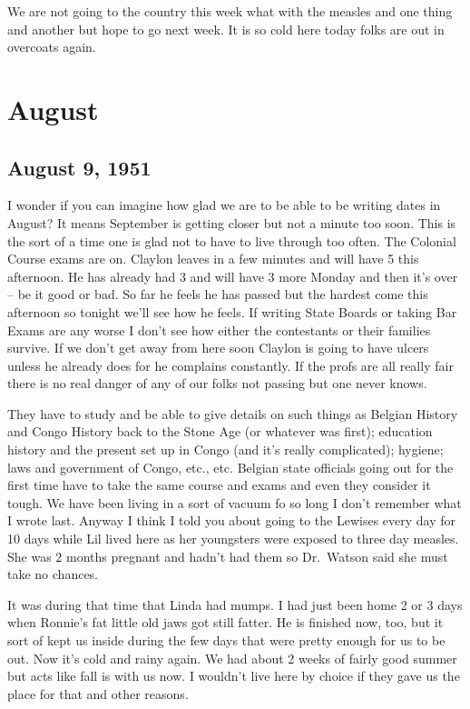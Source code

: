 \documentclass[
]{book}
\begin{document}
We are not going to the country this week what with the measles and one thing and another but hope to go next week. It is so cold here today folks are out in overcoats again.

\hypertarget{august-1}{%
\section{August}\label{august-1}}

\hypertarget{august-9-1951}{%
\subsection{August 9, 1951}\label{august-9-1951}}

I wonder if you can imagine how glad we are to be able to be writing dates in August? It means September is getting closer but not a minute too soon. This is the sort of a time one is glad not to have to live through too often. The Colonial Course exams are on. Claylon leaves in a few minutes and will have 5 this afternoon. He has already had 3 and will have 3 more Monday and then it's over -- be it good or bad. So far he feels he has passed but the hardest come this afternoon so tonight we'll see how he feels. If writing State Boards or taking Bar Exams are any worse I don't see how either the contestants or their families survive. If we don't get away from here soon Claylon is going to have ulcers unless he already does for he complains constantly. If the profs are all really fair there is no real danger of any of our folks not passing but one never knows.

They have to study and be able to give details on such things as Belgian History and Congo History back to the Stone Age (or whatever was first); education history and the present set up in Congo (and it's really complicated); hygiene; laws and government of Congo, etc., etc. Belgian state officials going out for the first time have to take the same course and exams and even they consider it tough. We have been living in a sort of vacuum fo so long I don't remember what I wrote last. Anyway I think I told you about going to the Lewises every day for 10 days while Lil lived here as her youngsters were exposed to three day measles. She was 2 months pregnant and hadn't had them so Dr.~Watson said she must take no chances.

It was during that time that Linda had mumps. I had just been home 2 or 3 days when Ronnie's fat little old jaws got still fatter. He is finished now, too, but it sort of kept us inside during the few days that were pretty enough for us to be out. Now it's cold and rainy again. We had about 2 weeks of fairly good summer but acts like fall is with us now. I wouldn't live here by choice if they gave us the place for that and other reasons.
\end{document}
